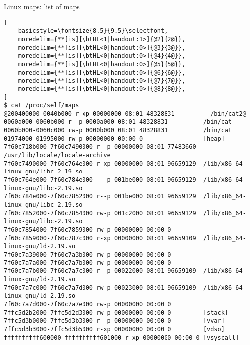 \usetikzlibrary{arrows.meta,calc,matrix,shapes.misc}

\begin{frame}[fragile,label=linuxMapsAreaStruct]{Linux maps: list of maps}
\lstset{language=}
\begin{lstlisting}[
    basicstyle=\fontsize{8.5}{9.5}\selectfont,
    moredelim={**[is][\btHL<1|handout:1>]{@2}{2@}},
    moredelim={**[is][\btHL<0|handout:0>]{@3}{3@}},
    moredelim={**[is][\btHL<0|handout:0>]{@4}{4@}},
    moredelim={**[is][\btHL<0|handout:0>]{@5}{5@}},
    moredelim={**[is][\btHL<0|handout:0>]{@6}{6@}},
    moredelim={**[is][\btHL<0|handout:0>]{@7}{7@}},
    moredelim={**[is][\btHL<0|handout:0>]{@8}{8@}},
]
$ cat /proc/self/maps
@200400000-0040b000 r-xp 00000000 08:01 48328831          /bin/cat2@
0060a000-0060b000 r--p 0000a000 08:01 48328831          /bin/cat
0060b000-0060c000 rw-p 0000b000 08:01 48328831          /bin/cat
01974000-01995000 rw-p 00000000 00:00 0                 [heap]
7f60c718b000-7f60c7490000 r--p 00000000 08:01 77483660  /usr/lib/locale/locale-archive
7f60c7490000-7f60c764e000 r-xp 00000000 08:01 96659129  /lib/x86_64-linux-gnu/libc-2.19.so
7f60c764e000-7f60c784e000 ---p 001be000 08:01 96659129  /lib/x86_64-linux-gnu/libc-2.19.so
7f60c784e000-7f60c7852000 r--p 001be000 08:01 96659129  /lib/x86_64-linux-gnu/libc-2.19.so
7f60c7852000-7f60c7854000 rw-p 001c2000 08:01 96659129  /lib/x86_64-linux-gnu/libc-2.19.so
7f60c7854000-7f60c7859000 rw-p 00000000 00:00 0 
7f60c7859000-7f60c787c000 r-xp 00000000 08:01 96659109  /lib/x86_64-linux-gnu/ld-2.19.so
7f60c7a39000-7f60c7a3b000 rw-p 00000000 00:00 0 
7f60c7a7a000-7f60c7a7b000 rw-p 00000000 00:00 0 
7f60c7a7b000-7f60c7a7c000 r--p 00022000 08:01 96659109  /lib/x86_64-linux-gnu/ld-2.19.so
7f60c7a7c000-7f60c7a7d000 rw-p 00023000 08:01 96659109  /lib/x86_64-linux-gnu/ld-2.19.so
7f60c7a7d000-7f60c7a7e000 rw-p 00000000 00:00 0 
7ffc5d2b2000-7ffc5d2d3000 rw-p 00000000 00:00 0         [stack]
7ffc5d3b0000-7ffc5d3b3000 r--p 00000000 00:00 0         [vvar]
7ffc5d3b3000-7ffc5d3b5000 r-xp 00000000 00:00 0         [vdso]
ffffffffff600000-ffffffffff601000 r-xp 00000000 00:00 0 [vsyscall]
\end{lstlisting}
\end{frame}
